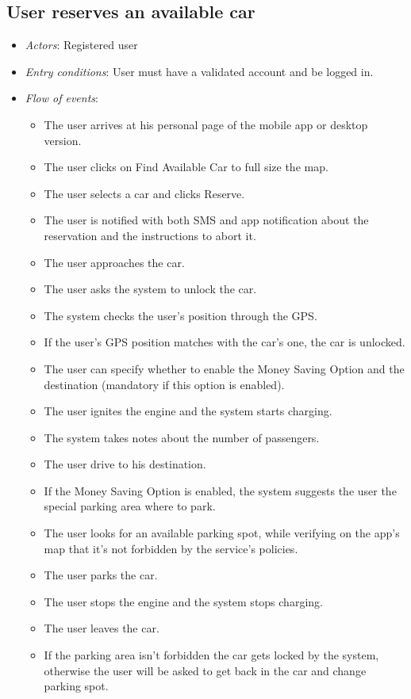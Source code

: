 \subsection{User reserves an available car}
\begin{itemize}
	\item \emph{Actors}: Registered user
	\item \emph{Entry conditions}: User must have a validated account and be logged in.
	\item \emph{Flow of events}:
	\begin{itemize}
		\item The user arrives at his personal page of the mobile app or desktop version.
		\item The user clicks on Find Available Car to full size the map.
		\item The user selects a car and clicks Reserve.
		\item The user is notified with both SMS and app notification about the reservation and the instructions to abort it.
		\item The user approaches the car.
		\item The user asks the system to unlock the car.
		\item The system checks the user's position through the GPS.
		\item If the user's GPS position matches with the car's one, the car is unlocked.
		\item The user can specify whether to enable the Money Saving Option and the destination (mandatory if this option is enabled).
		\item The user ignites the engine and the system starts charging.
		\item The system takes notes about the number of passengers.
		\item The user drive to his destination.
		\item If the Money Saving Option is enabled, the system suggests the user the special parking area where to park.
		\item The user looks for an available parking spot, while verifying on the app's map that it's not forbidden by the service's policies.
		\item The user parks the car.
		\item The user stops the engine and the system stops charging.
		\item The user leaves the car.
		\item If the parking area isn't forbidden the car gets locked by the system, otherwise the user will be asked to get back in the car and change parking spot.

\end{itemize}
\end{itemize}
